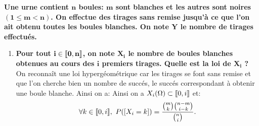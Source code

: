 \documentclass[a4paper, 11pt,reqno]{article}
\begin{document}
\begin{correction}  \;
	\textbf{Une urne contient $\mathbf{n}$ boules: $\mathbf{m}$ sont blanches et les autres sont noires $\mathbf{(1\leq m<n)}$. On effectue des tirages sans remise jusqu'\`a ce que l'on ait obtenu toutes les boules blanches. On note $\mathbf{Y}$ le nombre de tirages effectu\'es.}
	\begin{enumerate}
		\item \textbf{ Pour tout $\mathbf{i\in\llbracket  0,n\rrbracket}$, on note $\mathbf{X_i}$ le nombre de boules blanches obtenues au cours des $\mathbf{i}$ premiers tirages. Quelle est la loi de $\mathbf{X_i}$ ?}\\
		      \noindent On reconna\^{i}t une loi hyperg\'eom\'etrique car les tirages se font sans remise et que l'on cherche bien un nombre de succ\'es, le succ\'es correspondant \`{a} obtenir une boule blanche. Ainsi on a:  Ainsi on a $X_i(\Omega)\subset \llbracket  0,i\rrbracket$ et:
		      $$\forall k\in \llbracket  0,i\rrbracket,\ P(\lbrack X_i=k\rbrack)=\displaystyle\frac{  \binom{m}{k}  \binom{n-m}{i-k} }{  \binom{n}{i}  }.$$


\end{enumerate}
\end{correction}
\end{document}
